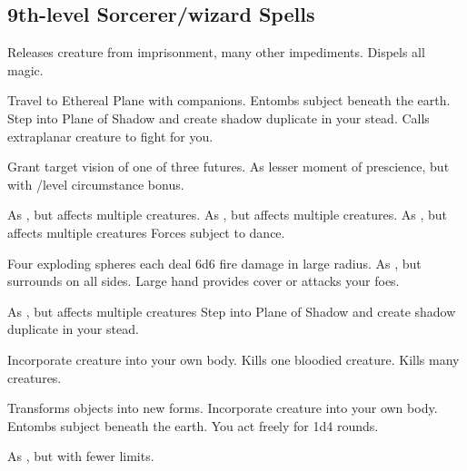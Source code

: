 \subsection{9th-level Sorcerer/wizard Spells} 
\begin{swspelllist}
   Releases creature from imprisonment, many other impediments.
   Dispels all magic.

   Travel to Ethereal Plane with companions.
   Entombs subject beneath the earth.
   Step into Plane of Shadow and create shadow duplicate in your stead.
   Calls extraplanar creature to fight for you.
  \spellheadrestricted{}

   Grant target vision of one of three futures.
   As lesser moment of prescience, but with /level circumstance bonus.

   As , but affects multiple creatures.
   As , but affects multiple creatures.
   As , but affects multiple creatures
   Forces subject to dance.

   Four exploding spheres each deal 6d6 fire damage in large radius.
   As , but surrounds on all sides.
   Large hand provides cover or attacks your foes.

   As , but affects multiple creatures
   Step into Plane of Shadow and create shadow duplicate in your stead.

   Incorporate creature into your own body.
   Kills one bloodied creature.
   Kills many creatures.

   Transforms objects into new forms.
   Incorporate creature into your own body.
   Entombs subject beneath the earth.
   You act freely for 1d4 rounds.

  \M As , but with fewer limits.
\end{swspelllist}

